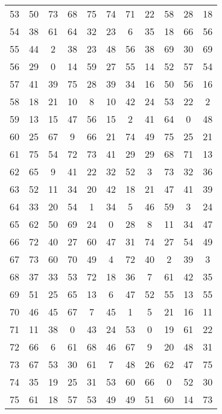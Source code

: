 \begin{table}
\begin{tabular}{c c c c c c c c c c c }
53 & 50 & 73 & 68 & 75 & 74 & 71 & 22 & 58 & 28 & 18 \\
54 & 38 & 61 & 64 & 32 & 23 & 6 & 35 & 18 & 66 & 56 \\
55 & 44 & 2 & 38 & 23 & 48 & 56 & 38 & 69 & 30 & 69 \\
56 & 29 & 0 & 14 & 59 & 27 & 55 & 14 & 52 & 57 & 54 \\
57 & 41 & 39 & 75 & 28 & 39 & 34 & 16 & 50 & 56 & 16 \\
58 & 18 & 21 & 10 & 8 & 10 & 42 & 24 & 53 & 22 & 2 \\
59 & 13 & 15 & 47 & 56 & 15 & 2 & 41 & 64 & 0 & 48 \\
60 & 25 & 67 & 9 & 66 & 21 & 74 & 49 & 75 & 25 & 21 \\
61 & 75 & 54 & 72 & 73 & 41 & 29 & 29 & 68 & 71 & 13 \\
62 & 65 & 9 & 41 & 22 & 32 & 52 & 3 & 73 & 32 & 36 \\
63 & 52 & 11 & 34 & 20 & 42 & 18 & 21 & 47 & 41 & 39 \\
64 & 33 & 20 & 54 & 1 & 34 & 5 & 46 & 59 & 3 & 24 \\
65 & 62 & 50 & 69 & 24 & 0 & 28 & 8 & 11 & 34 & 47 \\
66 & 72 & 40 & 27 & 60 & 47 & 31 & 74 & 27 & 54 & 49 \\
67 & 73 & 60 & 70 & 49 & 4 & 72 & 40 & 2 & 39 & 3 \\
68 & 37 & 33 & 53 & 72 & 18 & 36 & 7 & 61 & 42 & 35 \\
69 & 51 & 25 & 65 & 13 & 6 & 47 & 52 & 55 & 13 & 55 \\
70 & 46 & 45 & 67 & 7 & 45 & 1 & 5 & 21 & 16 & 11 \\
71 & 11 & 38 & 0 & 43 & 24 & 53 & 0 & 19 & 61 & 22 \\
72 & 66 & 6 & 61 & 68 & 46 & 67 & 9 & 20 & 48 & 31 \\
73 & 67 & 53 & 30 & 61 & 7 & 48 & 26 & 62 & 47 & 75 \\
74 & 35 & 19 & 25 & 31 & 53 & 60 & 66 & 0 & 52 & 30 \\
75 & 61 & 18 & 57 & 53 & 49 & 49 & 51 & 60 & 14 & 73 \\
\hline
\end{tabular}
\end{table}